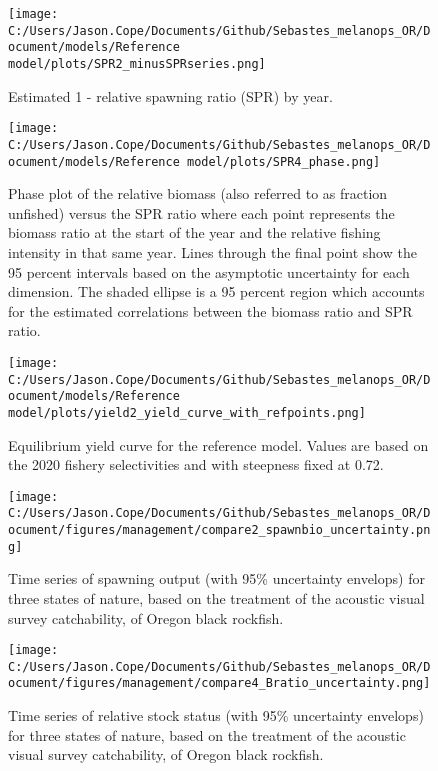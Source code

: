 \documentclass[11pt,
  english,
  letterpaper,
]{article}
\begin{document}
\begin{figure}
\centering
\texttt{[image: C:/Users/Jason.Cope/Documents/Github/Sebastes\_melanops\_OR/Document/models/Reference model/plots/SPR2\_minusSPRseries.png]}
\caption{Estimated 1 - relative spawning ratio (SPR) by year.\label{fig:1-spr}}
\end{figure}

\clearpage

\begin{figure}
\centering
\texttt{[image: C:/Users/Jason.Cope/Documents/Github/Sebastes\_melanops\_OR/Document/models/Reference model/plots/SPR4\_phase.png]}
\caption{Phase plot of the relative biomass (also referred to as fraction unfished) versus the SPR ratio where each point represents the biomass ratio at the start of the year and the relative fishing intensity in that same year. Lines through the final point show the 95 percent intervals based on the asymptotic uncertainty for each dimension. The shaded ellipse is a 95 percent region which accounts for the estimated correlations between the biomass ratio and SPR ratio.\label{fig:phase}}
\end{figure}

\newpage

\begin{figure}
\centering
\texttt{[image: C:/Users/Jason.Cope/Documents/Github/Sebastes\_melanops\_OR/Document/models/Reference model/plots/yield2\_yield\_curve\_with\_refpoints.png]}
\caption{Equilibrium yield curve for the reference model. Values are based on the 2020 fishery selectivities and with steepness fixed at 0.72.\label{fig:yield}}
\end{figure}

\newpage

\begin{figure}
\centering
\texttt{[image: C:/Users/Jason.Cope/Documents/Github/Sebastes\_melanops\_OR/Document/figures/management/compare2\_spawnbio\_uncertainty.png]}
\caption{Time series of spawning output (with 95\% uncertainty envelops) for three states of nature, based on the treatment of the acoustic visual survey catchability, of Oregon black rockfish.\label{fig:stateofnature_SO}}
\end{figure}

\begin{figure}
\centering
\texttt{[image: C:/Users/Jason.Cope/Documents/Github/Sebastes\_melanops\_OR/Document/figures/management/compare4\_Bratio\_uncertainty.png]}
\caption{Time series of relative stock status (with 95\% uncertainty envelops) for three states of nature, based on the treatment of the acoustic visual survey catchability, of Oregon black rockfish.\label{fig:stateofnature_depl}}
\end{figure}
\end{document}
